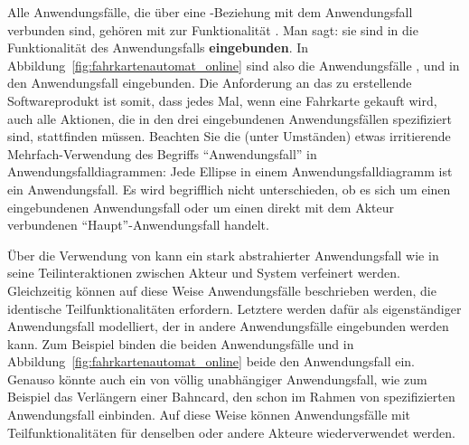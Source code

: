 Alle  Anwendungsfälle, die über eine -Beziehung mit dem Anwendungsfall  verbunden sind, gehören mit zur Funktionalität  . Man sagt: sie sind in die Funktionalität des Anwendungsfalls   \textbf{eingebunden}. In Abbildung~\ref{fig:fahrkartenautomat_online} sind also die Anwendungsfälle  ,   und   in den Anwendungsfall
\linebreak %
  eingebunden. Die Anforderung an das zu erstellende Software\-produkt ist somit, dass jedes Mal, wenn eine Fahrkarte gekauft wird, auch alle Aktionen, die in den drei eingebundenen Anwendungsfällen spezifiziert sind, stattfinden müssen. Beachten Sie die (unter Umständen) etwas irritierende Mehrfach-Verwendung des Begriffs "`Anwendungsfall"' in Anwendungsfalldiagrammen: Jede \mbox{Ellipse} in einem Anwendungsfalldiagramm ist ein Anwendungsfall. Es wird begrifflich nicht unterschieden, ob es sich um einen eingebundenen Anwendungsfall oder um einen direkt mit dem Akteur verbundenen "`Haupt"'-Anwendungsfall handelt.

Über die Verwendung von  kann ein stark abstrahierter Anwendungsfall wie  in seine Teilinteraktionen zwischen Akteur und System verfeinert werden. Gleichzeitig können auf diese Weise Anwendungsfälle beschrieben werden, die identische Teilfunktionalitäten erfordern. Letztere werden dafür als eigenständiger Anwendungsfall modelliert, der in andere Anwendungsfälle eingebunden werden kann. Zum Beispiel binden die beiden Anwendungsfälle   und   in Abbildung~\ref{fig:fahrkartenautomat_online} beide den Anwendungsfall  ein. Genauso könnte auch ein von  völlig unabhängiger Anwendungsfall, wie zum Beispiel das Verlängern einer Bahncard, den schon im Rahmen von   spezifizierten Anwendungsfall  einbinden. Auf diese Weise können Anwendungsfälle mit Teilfunktionalitäten für denselben oder andere Akteure wiederverwendet werden.

\vspace{1mm} %
 
